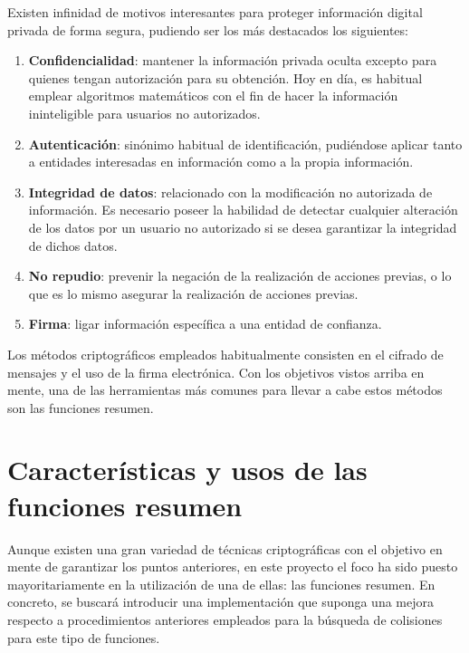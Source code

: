 \documentclass[12pt,spanish,listoffigures,listoftables,listofalgorithms]{tfgetsinf}
\begin{document}
Existen infinidad de motivos interesantes para proteger información digital privada de forma segura, pudiendo ser los más destacados los siguientes:

\begin{enumerate}
	
	\item \textbf{Confidencialidad}: mantener la información privada oculta excepto para quienes tengan autorización para su obtención. Hoy en día, es habitual emplear algoritmos matemáticos con el fin de hacer la información ininteligible para usuarios no autorizados.
	
	\item \textbf{Autenticación}: sinónimo habitual de identificación, pudiéndose aplicar tanto a entidades interesadas en información como a la propia información.

	\item \textbf{Integridad de datos}: relacionado con la modificación no autorizada de información. Es necesario poseer la habilidad de detectar cualquier alteración de los datos por un usuario no autorizado si se desea garantizar la integridad de dichos datos.

	\item \textbf{No repudio}: prevenir la negación de la realización de acciones previas, o lo que es lo mismo asegurar la realización de acciones previas.

	\item \textbf{Firma}: ligar información específica a una entidad de confianza.

\end{enumerate}

Los métodos criptográficos empleados habitualmente consisten en el cifrado de mensajes y el uso de la firma electrónica. Con los objetivos vistos arriba en mente, una de las herramientas más comunes para llevar a cabe estos métodos son las funciones resumen.

\section{Características y usos de las funciones resumen}

Aunque existen una gran variedad de técnicas criptográficas con el objetivo en mente de garantizar los puntos anteriores, en este proyecto el foco ha sido puesto mayoritariamente en la utilización de una de ellas: las funciones resumen. En concreto, se buscará introducir una implementación que suponga una mejora respecto a procedimientos anteriores empleados para la búsqueda de colisiones para este tipo de funciones.
\end{document}
